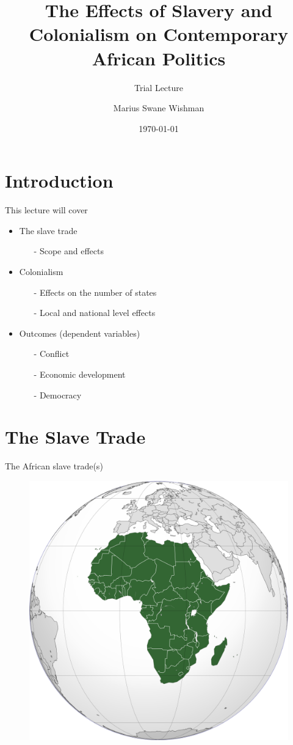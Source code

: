 \documentclass{beamer}
\title[Trial Lecture]{The Effects of Slavery and Colonialism on Contemporary
African Politics}
\subtitle{Trial Lecture}
\author[Wishman]{Marius Swane Wishman}
\date{\today}
\institute{NTNU}
\begin{document}
\begin{frame}[plain]
\titlepage 
\end{frame}

\section{Introduction} 

\begin{frame}{This lecture will cover}
\begin{itemize}
	\item The slave trade 
\begin{itemize}
	\item[-] Scope and effects 
\end{itemize}
	\item Colonialism 
		\begin{itemize}
			\item[-] Effects on the number of states 
			\item[-] Local and national level effects 
			
		\end{itemize}
	\item Outcomes (dependent variables)
		\begin{itemize}
			\item[-] Conflict
			\item[-] Economic development
			\item[-] Democracy
		\end{itemize}
\end{itemize}	
\end{frame}

\section{The Slave Trade}

\begin{frame}{The African slave trade(s)}

\begin{figure}
	\includegraphics[width=.7\linewidth]{img/africa.png}
\end{figure}

\end{frame}
\end{document}
